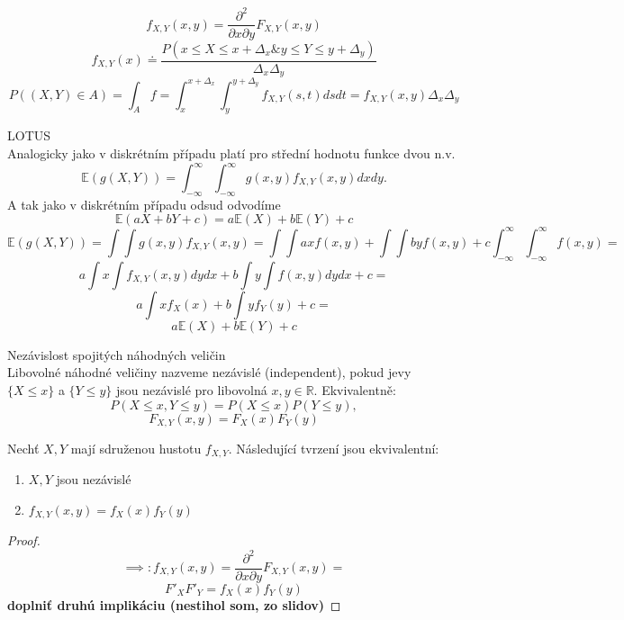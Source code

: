 \documentclass[../main.tex]{subfiles}
\begin{document}
\begin{remark}
    \[f_{X,Y}(x,y) = \frac{\partial^2}{\partial x \partial y} F_{X,Y}(x,y)\]
    \[f_{X,Y}(x) \doteq \frac{P(x\leq X \leq x + \Delta_x \& y\leq Y \leq y + \Delta_y)}{\Delta_x \Delta_y}\]
    \[P((X,Y)\in A) = \int_A f = \int^{x+\Delta_x}_x \int^{y+\Delta_y}_y f_{X,Y}(s,t)dsdt = f_{X,Y}(x,y)\Delta_x \Delta_y\]
\end{remark}

\begin{definition}
    LOTUS\\

    Analogicky jako v diskrétním případu platí pro střední hodnotu funkce dvou n.v.
    \[\mathbb{E}(g(X,Y)) = \int^\infty_{-\infty} \int^\infty_{-\infty} g(x,y)f_{X,Y}(x,y)dxdy.\]
    A tak jako v diskrétním případu odsud odvodíme
    \[\mathbb{E}(aX+bY+c) = a\mathbb{E}(X) + b\mathbb{E}(Y) + c\]
    \[\mathbb{E}(g(X,Y)) = \int \int g(x,y)f_{X,Y}(x,y) = \int \int ax f(x,y) + \int \int by f(x,y) + c \int^\infty_{-\infty}\int^\infty_{-\infty}f(x,y)=\]
    \[a \int x \int f_{X,Y}(x,y)dydx + b \int y \int f(x,y)dydx + c =\]
    \[a \int xf_X(x) + b \int yf_Y(y) + c = \]
    \[ a\mathbb{E}(X) + b\mathbb{E}(Y) + c\]
\end{definition}

\begin{definition}
    Nezávislost spojitých náhodných veličin\\

    Libovolné náhodné veličiny nazveme nezávislé (independent), pokud jevy $\{X\leq x\}$ a $\{Y\leq y\}$ jsou nezávislé pro libovolná $x,y \in \mathbb{R}$. Ekvivalentně:
    \[P(X\leq x, Y\leq y) = P(X\leq x)P(Y\leq y),\]
    \[F_{X,Y}(x,y) = F_X(x)F_Y(y)\]
\end{definition}
\begin{theorem}
    Nechť $X,Y$ mají sdruženou hustotu $f_{X,Y}$. Následující tvrzení jsou ekvivalentní:
    \begin{enumerate}
        \item $X,Y$ jsou nezávislé
        \item $f_{X,Y}(x,y) = f_X(x) f_Y(y)$
    \end{enumerate}
    
    \begin{proof}
        \[\implies : f_{X,Y}(x,y) = \frac{\partial^2}{\partial x \partial y} F_{X,Y}(x,y) = \]
        \[F'_X F'_Y = f_X(x)f_Y(y)\]
        \textbf{doplniť druhú implikáciu (nestihol som, zo slidov)}
    \end{proof}
\end{theorem}
\end{document}

